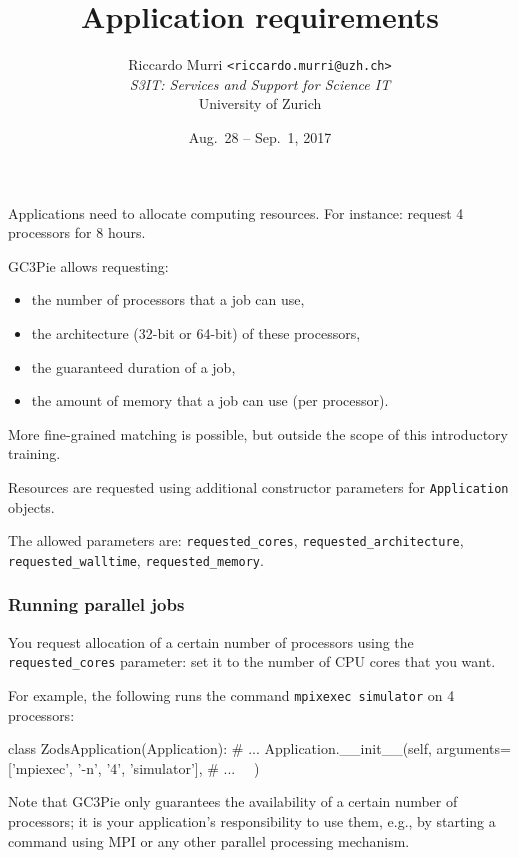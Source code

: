 \documentclass[english,serif,mathserif,xcolor=pdftex,dvipsnames,table]{beamer}
\title[Requirements]{%
  Application requirements
}
\author[R. Murri, S3IT UZH]{%
  Riccardo Murri \texttt{<riccardo.murri@uzh.ch>}
  \\[1ex]
  \emph{S3IT: Services and Support for Science IT}
  \\[1ex]
  University of Zurich
}
\date{Aug.~28 -- Sep.~1, 2017}
\begin{document}
\maketitle


\begin{frame}
  Applications need to allocate computing resources.
  For instance: request 4 processors for 8 hours.

  \+
  GC3Pie allows requesting:
  \begin{itemize}
  \item the number of processors that a job can use,
  \item the architecture (32-bit or 64-bit) of these processors,
  \item the guaranteed duration of a job,
  \item the amount of memory that a job can use (per processor).
  \end{itemize}

  \+
  More fine-grained matching is possible, but outside the scope of
  this introductory training.
\end{frame}


\begin{frame}[fragile]
  Resources are requested using additional constructor parameters for
  \texttt{Application} objects.

  \+
  The allowed parameters are:
  \lstinline|requested_cores|,
  \lstinline|requested_architecture|,
  \lstinline|requested_walltime|,
  \lstinline|requested_memory|.
\end{frame}


\begin{frame}[fragile]
  \frametitle{Running parallel jobs}

  You request allocation of a certain number of processors using the
  \lstinline|requested_cores| parameter: set it to the number of CPU
  cores that you want.

  \+
  For example, the following runs the command \texttt{mpixexec
    simulator} on 4 processors:
  \begin{python}
  class ZodsApplication(Application):
    # ...
    Application.__init__(self,
      arguments=['mpiexec', '-n', '4', 'simulator'],
      # ...
      ~~)
  \end{python}

  \+
  {\small Note that GC3Pie only guarantees the availability of a certain
    number of processors; it is your application's responsibility to use
    them, e.g., by starting a command using MPI or any other parallel
    processing mechanism.}
\end{frame}
\end{document}
